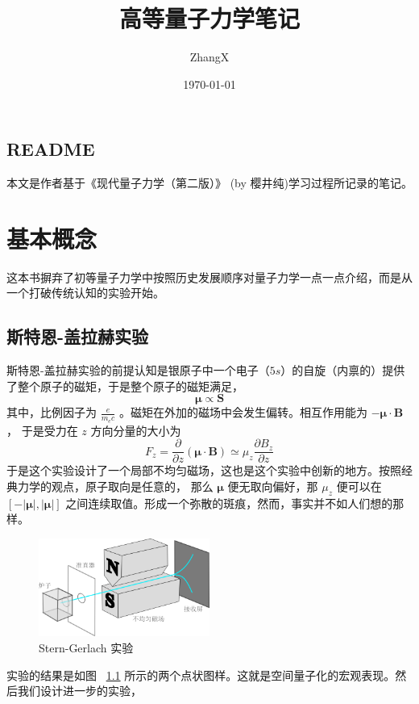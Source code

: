 \documentclass{book}
\title{高等量子力学笔记}
\author{ZhangX}
\date{\today} %
\newenvironment{abstract}{\section*{README}}{\par}
\begin{document}
\maketitle

\begin{abstract}
本文是作者基于《现代量子力学（第二版）》 (by 樱井纯)学习过程所记录的笔记。
\end{abstract}


\chapter{基本概念} %
这本书摒弃了初等量子力学中按照历史发展顺序对量子力学一点一点介绍，而是从一个打破传统认知的实验开始。
\section{斯特恩-盖拉赫实验}
斯特恩-盖拉赫实验的前提认知是银原子中一个电子（$5s$）的自旋（内禀的）提供了整个原子的磁矩，于是整个原子的磁矩满足，
\begin{equation}
    \bm{\mu} \propto \mathbf{S}
    \label{eq:1.1}
\end{equation}
其中，比例因子为 $\displaystyle \frac{e}{m_ec}$ 。磁矩在外加的磁场中会发生偏转。相互作用能为 $-\bm{\mu} \cdot \mathbf{B}$ ，
于是受力在 $z$ 方向分量的大小为
\begin{equation}
    F_z = \frac{\partial}{\partial z}\left(\bm{\mu}\cdot\mathbf{B}\right) 
    \simeq \mu_z \frac{\partial B_z}{\partial z}
    \label{eq:1.2}
\end{equation}
于是这个实验设计了一个局部不均匀磁场，这也是这个实验中创新的地方。按照经典力学的观点，原子取向是任意的，
那么 $\bm{\mu}$ 便无取向偏好，那 $\mu_z$ 便可以在 $[-|\bm{\mu}|, |\bm{\mu}|]$ 之间连续取值。形成一个弥散的斑痕，然而，事实并不如人们想的那样。
\begin{figure}[h]
    \centering
    \includegraphics[width=0.5\textwidth]{img/斯特恩}
    \caption{Stern-Gerlach 实验}
    \label{fig:1.1}
\end{figure} 
实验的结果是如图 ~\ref{fig:1.1} 所示的两个点状图样。这就是空间量子化的宏观表现。然后我们设计进一步的实验，
\end{document}
